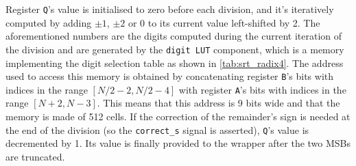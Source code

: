 Register \texttt{Q}'s value is initialised to zero before each division, and it's iteratively computed by adding $\pm 1$, $\pm 2$ or $0$ to its current value left-shifted by 2.
The aforementioned numbers are the digits computed during the current iteration of the division and are generated by the \texttt{digit LUT} component, which is a memory implementing the digit selection table as shown in \autoref{tab:srt_radix4}.
The address used to access this memory is obtained by concatenating register \texttt{B}'s bits with indices in the range $ [ N/2 - 2, N/2 - 4 ]$ with register \texttt{A}'s bits with indices in the range $ [ N + 2, N - 3 ]$.
This means that this address is 9 bits wide and that the memory is made of 512 cells.
If the correction of the remainder's sign is needed at the end of the division (so the \texttt{correct\_s} signal is asserted), \texttt{Q}'s value is decremented by 1.
Its value is finally provided to the wrapper after the two MSBs are truncated.

